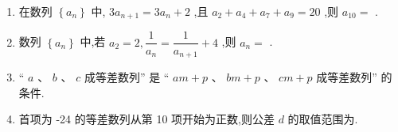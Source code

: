\begin{enumerate}
    \item 在数列 $\left\{  {a}_{n}\right\}$ 中, $3{a}_{n + 1} = 3{a}_{n} + 2$ ,且 ${a}_{2} + {a}_{4} + {a}_{7} + {a}_{9} = {20}$ ,则 ${a}_{10} =$ .
    
    \item 数列 $\left\{  {a}_{n}\right\}$ 中,若 ${a}_{2} = 2,\dfrac{1}{{a}_{n}} = \dfrac{1}{{a}_{n + 1}} + 4$ ,则 ${a}_{n} =$ .
    
    \item “ $a$ 、 $b$ 、 $c$ 成等差数列” 是 “ ${am} + p$ 、 ${bm} + p$ 、 ${cm} + p$ 成等差数列” 的条件.

    
    \item 首项为 -24 的等差数列从第 10 项开始为正数,则公差 $d$ 的取值范围为\blkda{$\left(\dfrac{8}{3}, 3\right]$}.


\end{enumerate}

